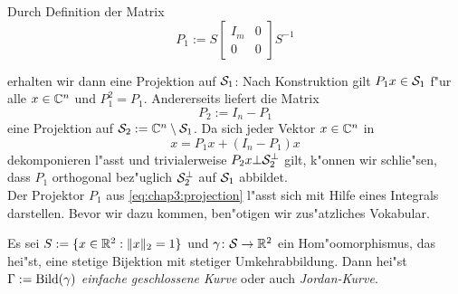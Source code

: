 \newpage
Durch Definition der Matrix
\begin{equation}\label{eq:chap3:projection}
P_1 := S \begin{bmatrix} I_m & 0 \\ 0 & 0 \end{bmatrix}S^{-1}
\end{equation}

erhalten wir dann eine Projektion auf $\S_1$: Nach Konstruktion gilt $P_1 x \in \S_1$ f"ur alle $x\in\Cn$
und $P_1^2 = P_1$. Andererseits liefert die Matrix
\[
P_2 := I_n - P_1
\]
eine Projektion auf $\S_2 := \Cn \setminus \S_1$.
Da sich jeder Vektor $x\in\Cn$ in
\[
x = P_1 x + (I_n - P_1)x
\]
dekomponieren l"asst und trivialerweise $P_2 x \bot \S_2^\bot$ gilt, k"onnen wir schlie"sen, dass $P_1$ orthogonal bez"uglich $\S_2^\bot$ auf $\S_1$ abbildet.\\

Der Projektor $P_1$ aus \eqref{eq:chap3:projection} l"asst sich mit Hilfe eines Integrals darstellen. Bevor wir dazu kommen, ben"otigen wir zus"atzliches Vokabular.

\begin{defn}
Es sei $S := \{x\in\R^2 : \|x\|_2 = 1\}$ und $\gamma\colon\S\to\R^2$ ein Hom"oomorphismus, das hei"st, eine stetige Bijektion mit stetiger Umkehrabbildung.
Dann hei"st $\Gamma := \Bild(\gamma)$ \emph{einfache geschlossene Kurve} oder auch \emph{Jordan-Kurve}.
\end{defn}

